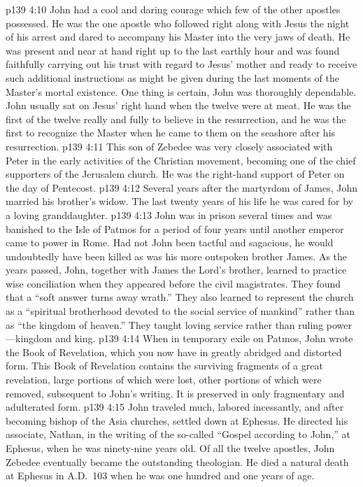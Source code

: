 \vs p139 4:10 John had a cool and daring courage which few of the other apostles possessed. He was the one apostle who followed right along with Jesus the night of his arrest and dared to accompany his Master into the very jaws of death. He was present and near at hand right up to the last earthly hour and was found faithfully carrying out his trust with regard to Jesus’ mother and ready to receive such additional instructions as might be given during the last moments of the Master’s mortal existence. One thing is certain, John was thoroughly dependable. John usually sat on Jesus’ right hand when the twelve were at meat. He was the first of the twelve really and fully to believe in the resurrection, and he was the first to recognize the Master when he came to them on the seashore after his resurrection.\plusone
\vs p139 4:11 This son of Zebedee was very closely associated with Peter in the early activities of the Christian movement, becoming one of the chief supporters of the Jerusalem church. He was the right\hyp{}hand support of Peter on the day of Pentecost.
\vs p139 4:12 Several years after the martyrdom of James, John married his brother’s widow. The last twenty years of his life he was cared for by a loving granddaughter.
\vs p139 4:13 John was in prison several times and was banished to the Isle of Patmos for a period of four years until another emperor came to power in Rome. Had not John been tactful and sagacious, he would undoubtedly have been killed as was his more outspoken brother James. As the years passed, John, together with James the Lord’s brother, learned to practice wise conciliation when they appeared before the civil magistrates. They found that a “soft answer turns away wrath.” They also learned to represent the church as a “spiritual brotherhood devoted to the social service of mankind” rather than as “the kingdom of heaven.” They taught loving service rather than ruling power---kingdom and king.\plusone
\vs p139 4:14 When in temporary exile on Patmos, John wrote the Book of Revelation, which you now have in greatly abridged and distorted form. This Book of Revelation contains the surviving fragments of a great revelation, large portions of which were lost, other portions of which were removed, subsequent to John’s writing. It is preserved in only fragmentary and adulterated form.
\vs p139 4:15 John traveled much, labored incessantly, and after becoming bishop of the Asia churches, settled down at Ephesus. He directed his associate, Nathan, in the writing of the so\hyp{}called “Gospel according to John,” at Ephesus, when he was ninety\hyp{}nine years old. Of all the twelve apostles, John Zebedee eventually became the outstanding theologian. He died a natural death at Ephesus in A.D.~103 when he was one hundred and one years of age.
